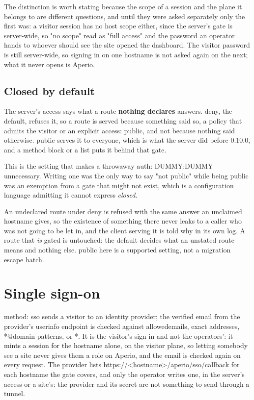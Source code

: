 \documentclass[11pt,a4paper,oneside]{book}
\newcommand{\aperiobreakableunderscore}{\textunderscore\allowbreak}
\newcommand{\aperiocodebreaks}{\XeTeXinterchartokenstate=1 }
\newcommand{\aperiocodebreaks}{}
\DeclareRobustCommand{\code}[1]{{\ttfamily\small\aperiocodebreaks
  \let\_\aperiobreakableunderscore#1}}
\begin{document}
The distinction is worth stating because the scope of a session and the
plane it belongs to are different questions, and until they were asked
separately only the first was: a visitor session has no host scope
either, since the server's gate is server-wide, so "no scope" read as
"full access" and the password an operator hands to whoever should see
the site opened the dashboard. The visitor password is still server-wide,
so signing in on one hostname is not asked again on the next; what it
never opens is Aperio.

\subsection{Closed by default}
\label{sec:default-access}

The server's \code{access} says what a route \textbf{nothing declares}
answers. \code{deny}, the default, refuses it, so a route is served
because something said so, a policy that admits the visitor or an explicit
\code{access: public}, and not because nothing said otherwise.
\code{public} serves it to everyone, which is what the server did before
0.10.0, and a method block or a list puts it behind that gate.

This is the setting that makes a throwaway \code{auth: DUMMY:DUMMY}
unnecessary. Writing one was the only way to say "not public" while
being public was an exemption from a gate that might not exist, which is
a configuration language admitting it cannot express \emph{closed}.

An undeclared route under \code{deny} is refused with the same answer an
unclaimed hostname gives, so the existence of something there never leaks
to a caller who was not going to be let in, and the client serving it is
told why in its own log. A route that \emph{is} gated is untouched: the
default decides what an unstated route means and nothing else.
\code{public} here is a supported setting, not a migration escape hatch.

\section{Single sign-on}

\code{method: sso} sends a visitor to an identity provider; the verified
email from the provider's userinfo endpoint is checked against
\code{allowed\_emails}, exact addresses, \code{*@domain} patterns, or
\code{*}. It is the visitor's sign-in and not the operators': it mints a
session for the hostname alone, on the visitor plane, so letting somebody
see a site never gives them a role on Aperio, and the email is checked
again on every request. The provider lists
\code{https://<hostname>/aperio/sso/callback} for each hostname the gate
covers, and only the operator writes one, in the server's \code{access} or
a site's: the provider and its secret are not something to send through a
tunnel.
\end{document}
